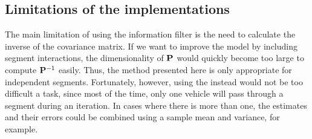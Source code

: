\subsection{Limitations of the implementations}
\label{sec:kf-limits}

The main limitation of using the information filter is the need to calculate the inverse of the covariance matrix. If we want to improve the model by including segment interactions, the dimensionality of $\mathbf{P}$ would quickly become too large to compute $\mathbf{P}^{-1}$ easily. Thus, the method presented here is only appropriate for independent segments. Fortunately, however, using the \kf{} instead would not be too difficult a task, since most of the time, only one vehicle will pass through a segment during an iteration. In cases where there is more than one, the estimates and their errors could be combined using a sample mean and variance, for example.
